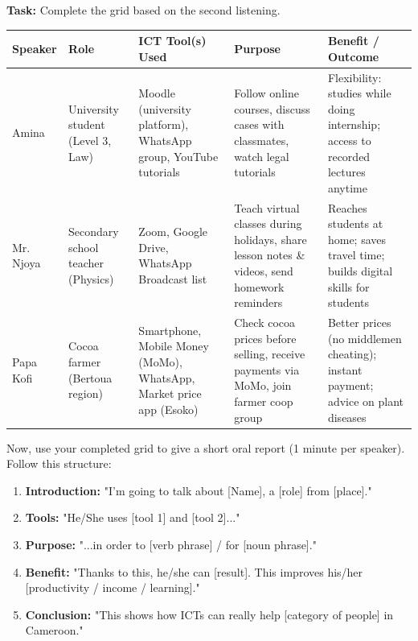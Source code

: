 \documentclass[11pt]{article}
\newcounter{popsec}
\newcounter{popsub}
\newcommand{\courssub}[1]{%
  \stepcounter{popsub}%
  \par\vspace{9pt}\noindent{\popxbold\fontsize{11.5}{13}\selectfont\color{popink}{\color{poporange}\thepopsec.\thepopsub}\hspace{6pt}#1}\par\nopagebreak\vspace{4pt}
}
\begin{document}
\begin{exoresolu}
\textbf{Task:} Complete the grid based on the second listening.
\tcblower
\begin{center}
\begin{tabularx}{\linewidth}{|l|X|X|X|X|}\hline
\textbf{Speaker} & \textbf{Role} & \textbf{ICT Tool(s) Used} & \textbf{Purpose} & \textbf{Benefit / Outcome} \\ \hline
Amina & University student (Level 3, Law) & Moodle (university platform), WhatsApp group, YouTube tutorials & Follow online courses, discuss cases with classmates, watch legal tutorials & Flexibility: studies while doing internship; access to recorded lectures anytime \\ \hline
Mr. Njoya & Secondary school teacher (Physics) & Zoom, Google Drive, WhatsApp Broadcast list & Teach virtual classes during holidays, share lesson notes \& videos, send homework reminders & Reaches students at home; saves travel time; builds digital skills for students \\ \hline
Papa Kofi & Cocoa farmer (Bertoua region) & Smartphone, Mobile Money (MoMo), WhatsApp, Market price app (Esoko) & Check cocoa prices before selling, receive payments via MoMo, join farmer coop group & Better prices (no middlemen cheating); instant payment; advice on plant diseases \\ \hline
\end{tabularx}
\end{center}
\end{exoresolu}

\courssub{Post-listening: Oral Report}

Now, use your completed grid to give a short oral report (1 minute per speaker). Follow this structure:

\begin{methode}
\begin{enumerate}
\item \textbf{Introduction:} "I'm going to talk about [Name], a [role] from [place]."
\item \textbf{Tools:} "He/She uses [tool 1] and [tool 2]..."
\item \textbf{Purpose:} "...in order to [verb phrase] / for [noun phrase]."
\item \textbf{Benefit:} "Thanks to this, he/she can [result]. This improves his/her [productivity / income / learning]."
\item \textbf{Conclusion:} "This shows how ICTs can really help [category of people] in Cameroon."
\end{enumerate}
\end{methode}
\end{document}
